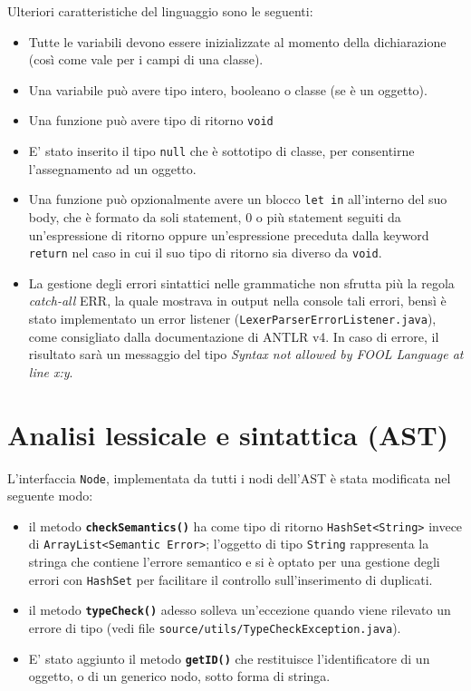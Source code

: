\documentclass[a4paper]{article}   %
\begin{document}
Ulteriori caratteristiche del linguaggio sono le seguenti:
\begin{itemize}
  \item Tutte le variabili devono essere inizializzate al momento della dichiarazione (così come vale per i campi di una classe).
  \item Una variabile può avere tipo intero, booleano o classe (se è un oggetto).
  \item Una funzione può avere tipo di ritorno \lstinline|void|
  \item E' stato inserito il tipo \lstinline|null| che è sottotipo di classe, per consentirne l'assegnamento ad un oggetto.
  \item Una funzione può opzionalmente avere un blocco \lstinline[language=ANTLR]|let in| all'interno del suo body, che è formato da soli statement, 0 o più statement seguiti da un'espressione di ritorno oppure un'espressione preceduta dalla keyword \lstinline[language=ANTLR]|return| nel caso in cui il suo tipo di ritorno sia diverso da \lstinline|void|.
  \item La gestione degli errori sintattici nelle grammatiche non sfrutta più la regola \textit{catch-all} ERR, la quale mostrava in output nella console tali errori, bensì è stato implementato un error listener (\lstinline|LexerParserErrorListener.java|), come consigliato dalla documentazione di ANTLR v4. In caso di errore, il risultato sarà un messaggio del tipo \textit{Syntax not allowed by FOOL Language at line x:y}.
\end{itemize}

\section{Analisi lessicale e sintattica (AST)}
L'interfaccia \lstinline|Node|, implementata da tutti i nodi dell'AST è stata modificata nel seguente modo:\\
\begin{itemize}
  \item il metodo \textbf{\lstinline|checkSemantics()|} ha come tipo di ritorno \lstinline|HashSet<String>| invece di \lstinline|ArrayList<Semantic Error>|; l'oggetto di tipo \lstinline|String| rappresenta la stringa che contiene l'errore semantico e si è optato per una gestione degli errori con \lstinline|HashSet| per facilitare il controllo sull'inserimento di duplicati.
  \item il metodo \textbf{\lstinline|typeCheck()|} adesso solleva un'eccezione quando viene rilevato un errore di tipo (vedi file \lstinline|source/utils/TypeCheckException.java|).
  \item E' stato aggiunto il metodo \textbf{\lstinline|getID()|} che restituisce l'identificatore di un oggetto, o di un generico nodo, sotto forma di stringa.
\end{itemize}
\end{document}
